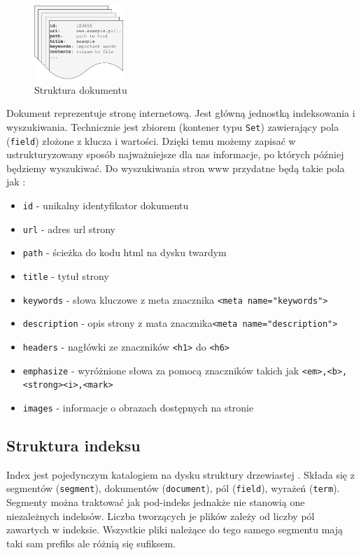 \documentclass[licencjacka]{pracadypl}
\theoremstyle{definition}
\begin{document}
\begin{figure}
	\centering
	\includegraphics[width=0.3\textwidth]{img/documents.png}
	\caption{Struktura dokumentu}
\end{figure}
Dokument reprezentuje stronę internetową. Jest główną jednostką indeksowania i wyszukiwania.
Technicznie jest zbiorem (kontener typu \texttt{Set}) zawierający pola (\texttt{field}) złożone z klucza i wartości.
Dzięki temu możemy zapisać w ustrukturyzowany sposób najważniejsze dla nas informacje, po których później będziemy wyszukiwać.
Do wyszukiwania stron www przydatne będą takie pola jak :
\begin{itemize}
	\item \texttt{id} - unikalny identyfikator dokumentu
	\item \texttt{url} - adres url strony
	\item \texttt{path} - ścieżka do kodu html na dysku twardym
	\item \texttt{title} - tytuł strony
	\item \texttt{keywords} - słowa kluczowe z meta znacznika \texttt{<meta name="keywords">}
	\item \texttt{description} - opis strony z mata znacznika\texttt{<meta name="description">}
	\item \texttt{headers} - nagłówki ze znaczników \texttt{<h1>} do \texttt{<h6>} 
	\item \texttt{emphasize} - wyróżnione słowa za pomocą znaczników takich jak \texttt{<em>,<b>,<strong><i>,<mark>}
	\item \texttt{images} - informacje o obrazach dostępnych na stronie
\end{itemize}


\subsection{Struktura indeksu}

Index jest pojedynczym katalogiem na dysku struktury drzewiastej \cite{lucene-article}. Składa się z segmentów (\texttt{segment}), dokumentów (\texttt{document}), pól (\texttt{field}), wyrażeń (\texttt{term}).
Segmenty można traktować jak pod-indeks jednakże nie stanowią one niezależnych indeksów. 
Liczba tworzących je plików zależy od liczby pól zawartych w indeksie.
Wszystkie pliki należące do tego samego segmentu mają taki sam prefiks ale różnią się sufiksem. 
\end{document}
